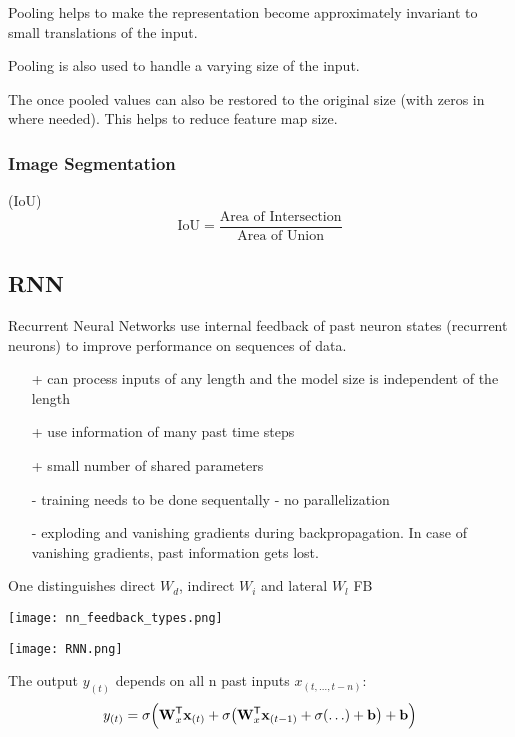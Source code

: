 Pooling helps to make the representation become approximately invariant to small translations of the input.

Pooling is also used to handle a varying size of the input.

\newpar{}

The once pooled values can also be restored to the original size (with zeros in where needed). This helps to reduce feature map size.

\subsubsection{Image Segmentation}

 (IoU)
\begin{equation*}
    \text{IoU} = \frac{\text{Area of Intersection}}{\text{Area of Union}}
\end{equation*}


\subsection{RNN}\label{sec:RNN}
Recurrent Neural Networks use internal feedback of past neuron states (recurrent neurons) to improve performance on sequences of data.
\begin{itemize}
    \item[+] can process inputs of any length and the model size is independent of the length
    \item[+] use information of many past time steps
    \item[+] small number of shared parameters
    \item[-] training needs to be done sequentally - no parallelization
    \item[-] exploding and vanishing gradients during backpropagation. In case of vanishing gradients, past information gets lost.
\end{itemize}
\newpar{}

One distinguishes direct $W_d$, indirect $W_i$ and lateral $W_l$ FB
\begin{center}
    \texttt{[image: nn\_feedback\_types.png]}
\end{center}
\newpar{}
\begin{center}
    \texttt{[image: RNN.png]}
\end{center}
The output $y_{(t)}$ depends on all n past inputs $x_{(t,\ldots,t-n)}$:
\noindent\begin{equation*}
    y_{(t)} = \sigma\Bigl(\mathbf{W}_x^{\mathsf{T}}\mathbf{x}_{(t)} + \sigma\bigl(\mathbf{W}_x^{\mathsf{T}}\mathbf{x}_{(t-1)} + \sigma( \ldots ) + \mathbf{b}\bigr) + \mathbf{b}\Bigr)
\end{equation*}

